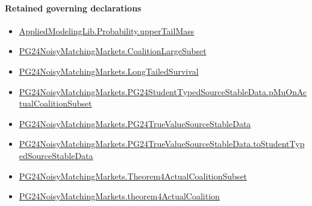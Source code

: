 \documentclass[10pt]{article}
\begin{document}
\paragraph{Retained governing declarations}
\begin{itemize}\raggedright
\item \hyperlink{governing-declaration-f983ca9c59dc317f}{Applied\allowbreak{}Modeling\allowbreak{}Lib.\allowbreak{}Probability.\allowbreak{}upper\allowbreak{}Tail\allowbreak{}Mass}
\item \hyperlink{governing-declaration-4fa0e2b6f69e9db8}{PG24\allowbreak{}Noisy\allowbreak{}Matching\allowbreak{}Markets.\allowbreak{}Coalition\allowbreak{}Large\allowbreak{}Subset}
\item \hyperlink{governing-declaration-e6c10c02961c0451}{PG24\allowbreak{}Noisy\allowbreak{}Matching\allowbreak{}Markets.\allowbreak{}Long\allowbreak{}Tailed\allowbreak{}Survival}
\item \hyperlink{governing-declaration-b9aef4c916fb025c}{PG24\allowbreak{}Noisy\allowbreak{}Matching\allowbreak{}Markets.\allowbreak{}PG24\allowbreak{}Student\allowbreak{}Typed\allowbreak{}Source\allowbreak{}Stable\allowbreak{}Data.\allowbreak{}p\allowbreak{}Mu\allowbreak{}On\allowbreak{}Actual\allowbreak{}Coalition\allowbreak{}Subset}
\item \hyperlink{governing-declaration-85595fc482827ece}{PG24\allowbreak{}Noisy\allowbreak{}Matching\allowbreak{}Markets.\allowbreak{}PG24\allowbreak{}True\allowbreak{}Value\allowbreak{}Source\allowbreak{}Stable\allowbreak{}Data}
\item \hyperlink{governing-declaration-a357f95266a221c0}{PG24\allowbreak{}Noisy\allowbreak{}Matching\allowbreak{}Markets.\allowbreak{}PG24\allowbreak{}True\allowbreak{}Value\allowbreak{}Source\allowbreak{}Stable\allowbreak{}Data.\allowbreak{}to\allowbreak{}Student\allowbreak{}Typed\allowbreak{}Source\allowbreak{}Stable\allowbreak{}Data}
\item \hyperlink{governing-declaration-f6cea2e13de849c3}{PG24\allowbreak{}Noisy\allowbreak{}Matching\allowbreak{}Markets.\allowbreak{}Theorem4\allowbreak{}Actual\allowbreak{}Coalition\allowbreak{}Subset}
\item \hyperlink{governing-declaration-07853e87a88917a1}{PG24\allowbreak{}Noisy\allowbreak{}Matching\allowbreak{}Markets.\allowbreak{}theorem4\allowbreak{}Actual\allowbreak{}Coalition}
\end{itemize}
\end{document}
